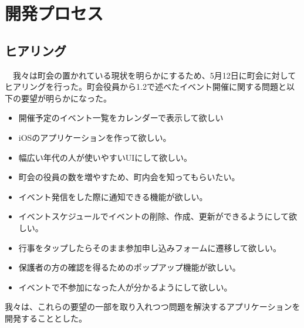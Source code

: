 \chapter{開発プロセス}

\section{ヒアリング}
　我々は町会の置かれている現状を明らかにするため、5月12日に町会に対してヒアリングを行った。町会役員から1.2で述べたイベント開催に関する問題と以下の要望が明らかになった。
\begin{itemize}
\item 開催予定のイベント一覧をカレンダーで表示して欲しい
\item iOSのアプリケーションを作って欲しい。
\item 幅広い年代の人が使いやすいUIにして欲しい。
\item 町会の役員の数を増やすため、町内会を知ってもらいたい。
\item イベント発信をした際に通知できる機能が欲しい。
\item イベントスケジュールでイベントの削除、作成、更新ができるようにして欲しい。
\item 行事をタップしたらそのまま参加申し込みフォームに遷移して欲しい。
\item 保護者の方の確認を得るためのポップアップ機能が欲しい。
\item イベントで不参加になった人が分かるようにして欲しい。
\end{itemize}
我々は、これらの要望の一部を取り入れつつ問題を解決するアプリケーションを開発することとした。

